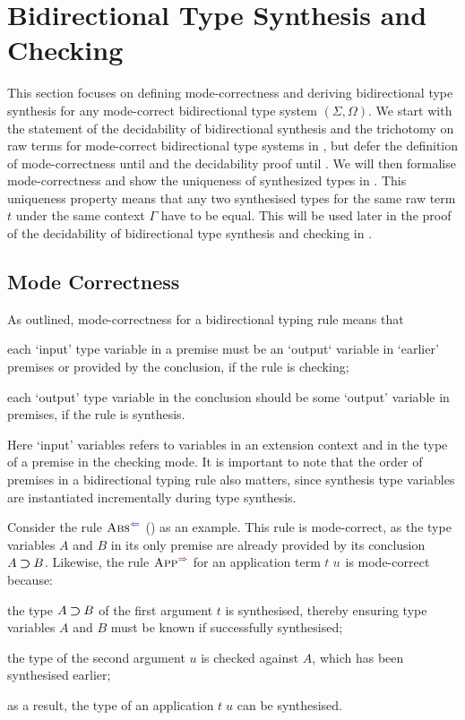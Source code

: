 
\section{Bidirectional Type Synthesis and Checking} \label{sec:type-synthesis}
This section focuses on defining mode-correctness and deriving bidirectional type synthesis for any mode-correct bidirectional type system $(\Sigma, \Omega)$.
We start with the statement of the decidability of bidirectional synthesis and the trichotomy on raw terms for mode-correct bidirectional type systems in , but defer the definition of mode-correctness until  and the decidability proof until .
We will then formalise mode-correctness and show the uniqueness of synthesized types in .
This uniqueness property means that any two synthesised types for the same raw term $t$ under the same context $\Gamma$ have to be equal.
This will be used later in the proof of the decidability of bidirectional type synthesis and checking in .


\subsection{Mode Correctness}\label{sec:mode-correctness}
As \citet{Dunfield2021} outlined, mode-correctness for a bidirectional typing rule means that 
\begin{enumerate*}
\item each `input' type variable in a premise must be an `output` variable in `earlier' premises or provided by the conclusion, if the rule is checking;
\item each `output' type variable in the conclusion should be some `output' variable in premises, if the rule is synthesis.
\end{enumerate*}
Here `input' variables refers to variables in an extension context and in the type of a premise in the checking mode.
It is important to note that the order of premises in a bidirectional typing rule also matters, since synthesis type variables are instantiated incrementally during type synthesis.

Consider the rule $\ChkRule{Abs}$ () as an example.
This rule is mode-correct, as the type variables $A$ and $B$ in its only premise are already provided by its conclusion $A \mathbin{\bm{\supset}} B$.
Likewise, the rule $\SynRule{App}$ for an application term $\isTerm{t\;u}$ is mode-correct because:
\begin{enumerate*}
\item the type $A \mathbin{\bm{\supset}} B$ of the first argument $t$ is synthesised, thereby ensuring type variables $A$ and $B$ must be known if successfully synthesised;
\item the type of the second argument $u$ is checked against $A$, which has been synthesised earlier;
\item as a result, the type of an application $t\;u$ can be synthesised.
\end{enumerate*}

